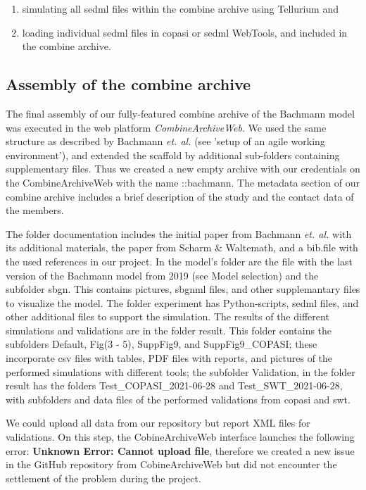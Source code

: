 \begin{enumerate}
    \item simulating all \ac{sedml} files within the \ac{combine} archive using Tellurium and
    \item loading individual \ac{sedml} files in \ac{copasi} or \ac{sedml} WebTools, and included in the \ac{combine} archive.
\end{enumerate}

\subsection*{Assembly of the \acs{combine} archive}

The final assembly of our fully-featured \ac{combine} archive of the Bachmann model was executed in the web platform \textit{CombineArchiveWeb}. We used the same structure as described by Bachmann \textit{et. al.} (see 'setup of an agile working environment'), and extended the scaffold by additional sub-folders containing supplementary files. Thus we created a new empty archive with our credentials on the CombineArchiveWeb with the name \textsf{::bachmann}. The metadata section of our \ac{combine} archive includes a brief description of the study and the contact data of the members.

The folder documentation includes the initial paper from Bachmann \textit{et. al.}  with its additional materials, the paper from Scharm \& Waltemath, and a \textsf{bib.file} with the used references in our project. In the model's folder are the file with the last version of the Bachmann model from 2019 (see Model selection) and the subfolder \textsf{sbgn}. This contains pictures, \ac{sbgnml} files, and other supplemantary files to visualize the model. The folder experiment has Python-scripts, \ac{sedml} files, and other additional files to support the simulation. The results of the different simulations and validations are in the folder result. This folder contains the subfolders Default, Fig(3 - 5), SuppFig9, and SuppFig9\_COPASI; these incorporate \ac{csv} files with tables, PDF files with reports, and pictures of the performed simulations with different tools; the subfolder Validation, in the folder result has the folders Test\_COPASI\_2021-06-28 and Test\_SWT\_2021-06-28, with subfolders and data files of the performed validations from \ac{copasi} and \ac{swt}.

We could upload all data from our repository but report XML files for validations. On this step, the CobineArchiveWeb interface launches the following error: \textbf{Unknown Error: Cannot upload file}, therefore we created a new issue in the GitHub repository from CobineArchiveWeb but did not encounter the settlement of the problem during the project.